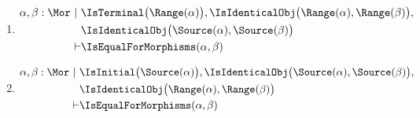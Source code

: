 \begin{enumerate}
 \item 
\begin{sequent}
\begin{align*}
  \alpha,\beta:\Mor ~|~ &\IsTerminal\big( \Range( \alpha ) \big), \IsIdenticalObj\big( \Range( \alpha ), \Range( \beta ) \big),\\	
  &\IsIdenticalObj\big( \Source( \alpha ), \Source( \beta ) \big)\\
  \vdash &\IsEqualForMorphisms( \alpha, \beta )
\end{align*}
\end{sequent}

\item
\begin{sequent}
\begin{align*}
  \alpha, \beta:\Mor  ~|~ &\IsInitial\big( \Source( \alpha ) \big), \IsIdenticalObj\big( \Source( \alpha ), \Source( \beta ) \big),\\
  &\IsIdenticalObj\big( \Range( \alpha ), \Range( \beta ) \big)\\
  \vdash &\IsEqualForMorphisms( \alpha, \beta )
\end{align*}
\end{sequent}

\end{enumerate}

